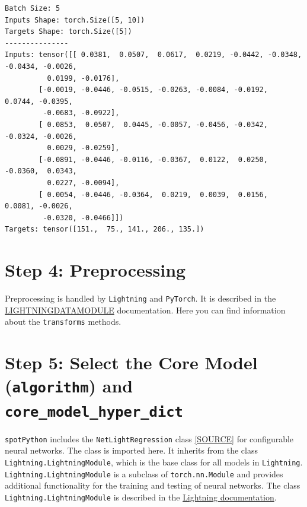 \documentclass[
  letterpaper,
  DIV=11,
  numbers=noendperiod]{scrreprt}
\begin{document}
\begin{tcolorbox}
\begin{verbatim}
Batch Size: 5
Inputs Shape: torch.Size([5, 10])
Targets Shape: torch.Size([5])
---------------
Inputs: tensor([[ 0.0381,  0.0507,  0.0617,  0.0219, -0.0442, -0.0348, -0.0434, -0.0026,
          0.0199, -0.0176],
        [-0.0019, -0.0446, -0.0515, -0.0263, -0.0084, -0.0192,  0.0744, -0.0395,
         -0.0683, -0.0922],
        [ 0.0853,  0.0507,  0.0445, -0.0057, -0.0456, -0.0342, -0.0324, -0.0026,
          0.0029, -0.0259],
        [-0.0891, -0.0446, -0.0116, -0.0367,  0.0122,  0.0250, -0.0360,  0.0343,
          0.0227, -0.0094],
        [ 0.0054, -0.0446, -0.0364,  0.0219,  0.0039,  0.0156,  0.0081, -0.0026,
         -0.0320, -0.0466]])
Targets: tensor([151.,  75., 141., 206., 135.])
\end{verbatim}

\end{tcolorbox}

\section{Step 4: Preprocessing}\label{sec-preprocessing-31}

Preprocessing is handled by \texttt{Lightning} and \texttt{PyTorch}. It
is described in the
\href{https://lightning.ai/docs/pytorch/stable/data/datamodule.html}{LIGHTNINGDATAMODULE}
documentation. Here you can find information about the
\texttt{transforms} methods.

\section{\texorpdfstring{Step 5: Select the Core Model
(\texttt{algorithm}) and
\texttt{core\_model\_hyper\_dict}}{Step 5: Select the Core Model (algorithm) and core\_model\_hyper\_dict}}\label{sec-selection-of-the-algorithm-31}

\texttt{spotPython} includes the \texttt{NetLightRegression} class
\href{https://github.com/sequential-parameter-optimization/spotPython/blob/main/src/spotPython/light/netlightregression.py}{{[}SOURCE{]}}
for configurable neural networks. The class is imported here. It
inherits from the class \texttt{Lightning.LightningModule}, which is the
base class for all models in \texttt{Lightning}.
\texttt{Lightning.LightningModule} is a subclass of
\texttt{torch.nn.Module} and provides additional functionality for the
training and testing of neural networks. The class
\texttt{Lightning.LightningModule} is described in the
\href{https://lightning.ai/docs/pytorch/stable/common/lightning_module.html}{Lightning
documentation}.
\end{document}
